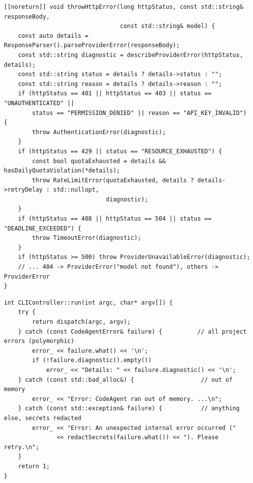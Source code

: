 \documentclass[12pt,a4paper,oneside]{book}
\begin{document}
\begin{lstlisting}[style=codeagentcpp,caption={Throwing typed exceptions from HTTP status codes (\texttt{LLMClient.cpp}, abridged)},label={lst:ca-throw}]
[[noreturn]] void throwHttpError(long httpStatus, const std::string& responseBody,
                                 const std::string& model) {
    const auto details = ResponseParser().parseProviderError(responseBody);
    const std::string diagnostic = describeProviderError(httpStatus, details);
    const std::string status = details ? details->status : "";
    const std::string reason = details ? details->reason : "";
    if (httpStatus == 401 || httpStatus == 403 || status == "UNAUTHENTICATED" ||
        status == "PERMISSION_DENIED" || reason == "API_KEY_INVALID") {
        throw AuthenticationError(diagnostic);
    }
    if (httpStatus == 429 || status == "RESOURCE_EXHAUSTED") {
        const bool quotaExhausted = details && hasDailyQuotaViolation(*details);
        throw RateLimitError(quotaExhausted, details ? details->retryDelay : std::nullopt,
                             diagnostic);
    }
    if (httpStatus == 408 || httpStatus == 504 || status == "DEADLINE_EXCEEDED") {
        throw TimeoutError(diagnostic);
    }
    if (httpStatus >= 500) throw ProviderUnavailableError(diagnostic);
    // ... 404 -> ProviderError("model not found"), others -> ProviderError
}
\end{lstlisting}

\begin{lstlisting}[style=codeagentcpp,caption={The CLI error boundary: catch from most specific to most general},label={lst:ca-catch}]
int CLIController::run(int argc, char* argv[]) {
    try {
        return dispatch(argc, argv);
    } catch (const CodeAgentError& failure) {          // all project errors (polymorphic)
        error_ << failure.what() << '\n';
        if (!failure.diagnostic().empty())
            error_ << "Details: " << failure.diagnostic() << '\n';
    } catch (const std::bad_alloc&) {                   // out of memory
        error_ << "Error: CodeAgent ran out of memory. ...\n";
    } catch (const std::exception& failure) {           // anything else, secrets redacted
        error_ << "Error: An unexpected internal error occurred ("
               << redactSecrets(failure.what()) << "). Please retry.\n";
    }
    return 1;
}
\end{lstlisting}
\end{document}
